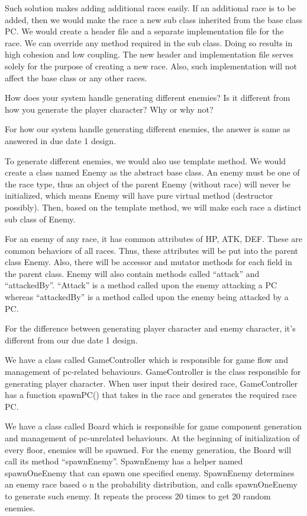 \documentclass[11pt]{article}
\theoremstyle{plain} \newtheorem{theorem*}{Theorem}[subsection]
\begin{document}
Such solution makes adding additional races easily. If an additional race is to
be added, then we would make the race a new sub class inherited from the base
class PC. We would create a header file and a separate implementation file for
the race. We can override any method required in the sub class. Doing so
results in high cohesion and low coupling. The new header and implementation
file serves solely for the purpose of creating a new race. Also, such
implementation will not affect the base class or any other races. 

How does your system handle generating different enemies? Is it different from
how you generate the player character? Why or why not? 

For how our system handle generating different enemies, the answer is same as
answered in due date 1 design. 

To generate different enemies, we would also use template method. We would
create a class named Enemy as the abstract base class. An enemy must be one of
the race type, thus an object of the parent Enemy (without race) will never be
initialized, which means Enemy will have pure virtual method (destructor
possibly). Then, based on the template method, we will make each race a
distinct sub class of Enemy.  

For an enemy of any race, it has common attributes of HP, ATK, DEF. These are
common behaviors of all races. Thus, these attributes will be put into the
parent class Enemy. Also, there will be accessor and mutator methods for each
field in the parent class. Enemy will also contain methods called “attack” and
“attackedBy”. “Attack” is a method called upon the enemy attacking a PC whereas
“attackedBy” is a method called upon the enemy being attacked by a PC. 

For the difference between generating player character and enemy character,
it’s different from our due date 1 design. 


We have a class called GameController which is responsible for game flow and
management of pc-related behaviours. GameController is the class responsible
for generating player character. When user input their desired race,
GameController has a function spawnPC() that takes in the race and generates
the required race PC.  

We have a class called Board which is responsible for game component generation
and management of pc-unrelated behaviours.  At the beginning of initialization
of every floor, enemies will be spawned. For the enemy generation, the Board
will call its method “spawnEnemy”. SpawnEnemy has a helper named spawnOneEnemy
that can spawn one specified enemy. SpawnEnemy determines an enemy race based o
n the probability distribution, and calls spawnOneEnemy to generate such enemy.
It repeats the process 20 times to get 20 random enemies. 
\end{document}
